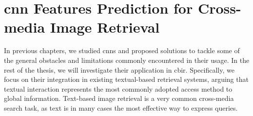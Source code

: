 
\graphicspath{{img/t2v/}}

\def\xt{\mathbf{\tilde{x}}} %
\def\t{\mathbf{t}} %
\def\s{\mathbf{s}} %
\def\e{\mathbf{e}} %
\def\E{\mathbf{E}} %

\newcommand{\ttv}{\textsc{Text2Vis}}
\newcommand{\sparsettv}{\textsc{S-Text2Vis}}
\newcommand{\densettv}{\textsc{D-Text2Vis}}
\newcommand{\widedeepttv}{\textsc{W\&D-Text2Vis}}
\newcommand{\visreg}{\textsc{VisReg}}
\newcommand{\wordvisual}{\textsc{Word2VisualVec}}
\newcommand{\resnet}{\gls{resnet}-152}

\chapter{\acrshort{cnn} Features Prediction for Cross-media Image Retrieval}
\label{ch:text2vis}


In previous chapters, we studied \glspl{cnn} and proposed solutions to tackle some of the general obstacles and limitations commonly encountered in their usage.
In the rest of the thesis, we will investigate their application in \acrlong{cbir}.
Specifically, we focus on their integration in existing textual-based retrieval systems, arguing that textual interaction represents the most commonly adopted access method to global information. %
Text-based image retrieval is a very common cross-media search task, as text is in many cases the most effective way to express queries.

